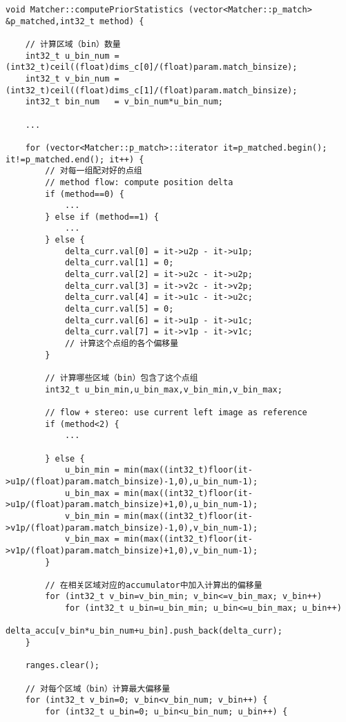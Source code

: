 \documentclass[UTF8]{ctexart}
\begin{document}
    \begin{verbatim}
void Matcher::computePriorStatistics (vector<Matcher::p_match> &p_matched,int32_t method) {
    
    // 计算区域（bin）数量
    int32_t u_bin_num = (int32_t)ceil((float)dims_c[0]/(float)param.match_binsize);
    int32_t v_bin_num = (int32_t)ceil((float)dims_c[1]/(float)param.match_binsize);
    int32_t bin_num   = v_bin_num*u_bin_num;
    
    ...

    for (vector<Matcher::p_match>::iterator it=p_matched.begin(); it!=p_matched.end(); it++) {
        // 对每一组配对好的点组
        // method flow: compute position delta
        if (method==0) {
            ... 
        } else if (method==1) {
            ... 
        } else {
            delta_curr.val[0] = it->u2p - it->u1p;
            delta_curr.val[1] = 0;
            delta_curr.val[2] = it->u2c - it->u2p;
            delta_curr.val[3] = it->v2c - it->v2p;
            delta_curr.val[4] = it->u1c - it->u2c;
            delta_curr.val[5] = 0;
            delta_curr.val[6] = it->u1p - it->u1c;
            delta_curr.val[7] = it->v1p - it->v1c;
            // 计算这个点组的各个偏移量
        }
        
        // 计算哪些区域（bin）包含了这个点组
        int32_t u_bin_min,u_bin_max,v_bin_min,v_bin_max;

        // flow + stereo: use current left image as reference
        if (method<2) {
            ...
        
        } else {
            u_bin_min = min(max((int32_t)floor(it->u1p/(float)param.match_binsize)-1,0),u_bin_num-1);
            u_bin_max = min(max((int32_t)floor(it->u1p/(float)param.match_binsize)+1,0),u_bin_num-1);
            v_bin_min = min(max((int32_t)floor(it->v1p/(float)param.match_binsize)-1,0),v_bin_num-1);
            v_bin_max = min(max((int32_t)floor(it->v1p/(float)param.match_binsize)+1,0),v_bin_num-1);
        }
        
        // 在相关区域对应的accumulator中加入计算出的偏移量
        for (int32_t v_bin=v_bin_min; v_bin<=v_bin_max; v_bin++)
            for (int32_t u_bin=u_bin_min; u_bin<=u_bin_max; u_bin++)
                delta_accu[v_bin*u_bin_num+u_bin].push_back(delta_curr);
    }
    
    ranges.clear();
    
    // 对每个区域（bin）计算最大偏移量
    for (int32_t v_bin=0; v_bin<v_bin_num; v_bin++) {
        for (int32_t u_bin=0; u_bin<u_bin_num; u_bin++) {
            

\end{verbatim}
\end{document}
